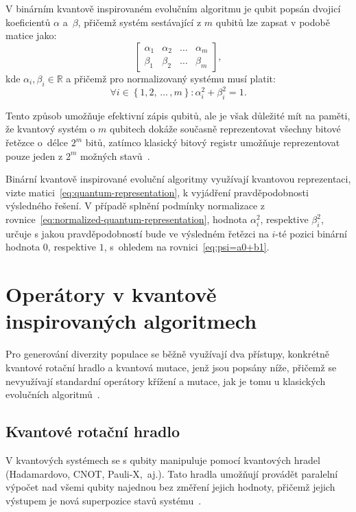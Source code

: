 V binárním kvantově inspirovaném evolučním algoritmu je qubit popsán dvojicí koeficientů $\alpha$ a~$\beta$, přičemž systém sestávající z $m$ qubitů lze zapsat v podobě matice jako: 
\begin{equation}\label{eq:quantum-representation}
    \begin{bmatrix}
        \alpha_1 & \alpha_2 & \dots & \alpha_m \\
        \beta_1  & \beta_2  & \dots & \beta_m
    \end{bmatrix},
\end{equation}
kde $\alpha_i,\beta_i \in \mathbb{R}$ a přičemž pro normalizovaný systému musí platit:
\begin{equation}\label{eq:normalized-quantum-representation}
    \forall i \in \left\{1,2,\,\dots\,,m \right\}: \alpha^2_i + \beta^2_i = 1.
\end{equation}

Tento způsob umožňuje efektivní zápis qubitů, ale je však důležité mít na paměti, že kvantový systém o $m$ qubitech dokáže současně reprezentovat všechny bitové řetězce o~délce $2^m$ bitů, zatímco klasický bitový registr umožňuje reprezentovat pouze jeden z $2^m$ možných stavů~\cite{NaturalComputing}. 

Binární kvantově inspirované evoluční algoritmy využívají kvantovou reprezentaci, vizte matici~\ref{eq:quantum-representation}, k vyjádření pravděpodobnosti výsledného řešení. 
V případě splnění podmínky normalizace z rovnice~\ref{eq:normalized-quantum-representation}, hodnota $\alpha^2_i$, respektive $\beta^2_i$, určuje s jakou pravděpodobností bude ve výsledném řetězci na $i$-té pozici binární hodnota $0$, respektive $1$, s~ohledem na rovnici~\ref{eq:psi=a0+b1}.

\section{Operátory v kvantově inspirovaných algoritmech}
Pro generování diverzity populace se běžně využívají dva přístupy, konkrétně kvantové rotační hradlo a kvantová mutace, jenž jsou popsány níže, přičemž se nevyužívají standardní operátory křížení a mutace, jak je tomu u klasických evolučních algoritmů~\cite{NaturalComputing}.

\subsection{Kvantové rotační hradlo}\label{subsec:quantum-gates}
V kvantových systémech se s qubity manipuluje pomocí kvantových hradel (Hadamardovo, CNOT, Pauli-X,~aj.). 
Tato hradla umožňují provádět paralelní výpočet nad všemi qubity najednou bez změření jejich hodnoty, přičemž jejich výstupem je nová superpozice stavů systému~\cite{NaturalComputing,QuantumComputing-Curious,QuantumComputing-QuantumInformation}. 

